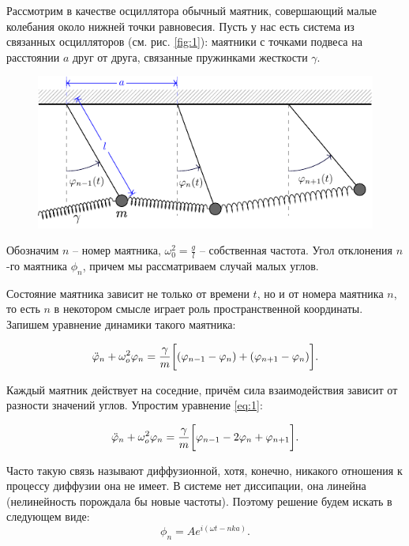 
Рассмотрим в качестве осциллятора обычный маятник, совершающий малые колебания около нижней точки равновесия. Пусть у нас есть система из связанных осцилляторов (см. рис. \ref{fig:1}): маятники с точками подвеса на расстоянии $a$ друг от друга, связанные пружинками жесткости $\gamma$. 

\begin{figure}[h!]
	\centering
	\includegraphics[scale=1.5]{img/osci_and_wave_in_ordered_struct/struct_of_pend}
	\label{fig:fig1}
\end{figure}

Обозначим $n$ -- номер маятника, $\omega_0^2=\frac{g}{l}$ -- собственная частота. Угол отклонения $n$-го маятника $\phi_n$, причем мы рассматриваем случай малых углов.


Состояние маятника зависит не только от времени $t$, но и от номера маятника $n$, то есть $n$ в некотором смысле играет роль пространственной координаты. Запишем уравнение динамики такого маятника:

\begin{equation}
	\ddot{\varphi}_n+\omega^2_o \varphi_n=\frac{\gamma}{m}\qty[\vphantom{\bigg|}(\varphi_{n-1}-\varphi_n)+(\varphi_{n+1}-\varphi_n)].
	\label{eq:1}
\end{equation}

Каждый маятник действует на соседние, причём сила взаимодействия зависит от разности значений углов. Упростим уравнение \eqref{eq:1}:

\begin{equation*}
	\ddot{\varphi}_n+\omega^2_o \varphi_n=\frac{\gamma}{m}\qty[\vphantom{\bigg|}\varphi_{n-1}-2\varphi_n+\varphi_{n+1}].
\end{equation*}

Часто такую связь называют диффузионной, хотя, конечно, никакого отношения к процессу диффузии она не имеет. В системе нет диссипации, она линейна (нелинейность порождала бы новые частоты). Поэтому решение будем искать в следующем виде:
\begin{equation}
	\phi_n=A e^{i(\omega t-nka)}.
	\label{eq:2}
\end{equation}


